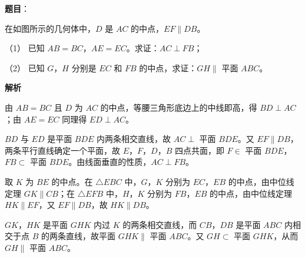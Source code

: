 \begin{answer}

\textbf{题目}：

在如图所示的几何体中，\(D\) 是 \(AC\) 的中点，\(EF\parallel DB\)。

（1） 已知 \(AB=BC\)，\(AE=EC\)。求证：\(AC\perp FB\)；

（2） 已知 \(G\)，\(H\) 分别是 \(EC\) 和 \(FB\) 的中点，求证：\(GH\parallel\) 平面 \(ABC\)。
\nopagebreak[4]
\begin{center}\end{center}
\nopagebreak[4]
\textbf{解析}


由 \(AB=BC\) 且 \(D\) 为 \(AC\) 的中点，等腰三角形底边上的中线即高，得 \(BD\perp AC\)；由 \(AE=EC\) 同理得 \(ED\perp AC\)。

\(BD\) 与 \(ED\) 是平面 \(BDE\) 内两条相交直线，故 \(AC\perp\) 平面 \(BDE\)。又 \(EF\parallel DB\)，两条平行直线确定一个平面，故 \(E\)，\(F\)，\(D\)，\(B\) 四点共面，即 \(F\in\) 平面 \(BDE\)，\(FB\subset\) 平面 \(BDE\)。由线面垂直的性质，\(AC\perp FB\)。


取 \(K\) 为 \(BE\) 的中点。在 \(\triangle EBC\) 中，\(G\)，\(K\) 分别为 \(EC\)，\(EB\) 的中点，由中位线定理 \(GK\parallel CB\)；在 \(\triangle EFB\) 中，\(H\)，\(K\) 分别为 \(FB\)，\(EB\) 的中点，由中位线定理 \(HK\parallel EF\)，又 \(EF\parallel DB\)，故 \(HK\parallel DB\)。

\(GK\)，\(HK\) 是平面 \(GHK\) 内过 \(K\) 的两条相交直线，而 \(CB\)，\(DB\) 是平面 \(ABC\) 内相交于点 \(B\) 的两条直线，故平面 \(GHK\parallel\) 平面 \(ABC\)。又 \(GH\subset\) 平面 \(GHK\)，从而 \(GH\parallel\) 平面 \(ABC\)。



\end{answer}
